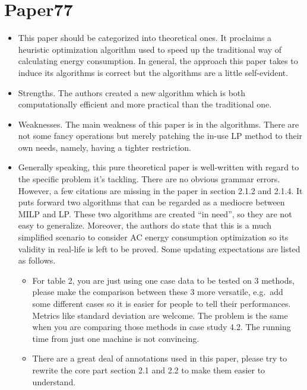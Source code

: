 \documentclass{article}
\begin{document}
\section{Paper77}
\label{sec:paper77}
\begin{itemize}
\item This paper should be categorized into theoretical ones. It
  proclaims a heuristic optimization algorithm used to speed up the
  traditional way of calculating energy consumption. In general, the
  approach this paper takes to induce its algorithms is correct but
  the algorithms are a little self-evident. 
\item Strengths. The authors created a new algorithm which is both
  computationally efficient and more practical than the traditional
  one. 
\item Weaknesses. The main weakness of this paper is in the
  algorithms. There are not some fancy operations but merely patching
  the in-use LP method to their own needs, namely, having a tighter
  restriction. 
\item Generally speaking, this pure theoretical paper is well-written
  with regard to the specific problem it's tackling. There are no
  obvious grammar errors. However, a few citations are missing in the
  paper in section 2.1.2 and 2.1.4. It puts forward two algorithms
  that can be regarded as a mediocre between MILP and LP. These two
  algorithms are created ``in need'', so they are not easy to
  generalize. Moreover, the authors do state that this is a much
  simplified scenario to consider AC energy consumption optimization
  so its validity in real-life is left to be proved. Some updating
  expectations are listed as follows.
  \begin{itemize}
  \item For table 2, you are just using one case data to be tested on
    3 methods, please make the comparison between these 3 more
    versatile, e.g.\ add some different cases so it is easier for
    people to tell their performances. Metrics like standard deviation
    are welcome. The problem is the same when you are comparing those
    methods in case study 4.2. The running time from just one machine
    is not convincing.
  \item There are a great deal of annotations used in this paper,
    please try to rewrite the core part section 2.1 and 2.2 to make
    them easier to understand.
  \end{itemize}
\end{itemize}
\end{document}
